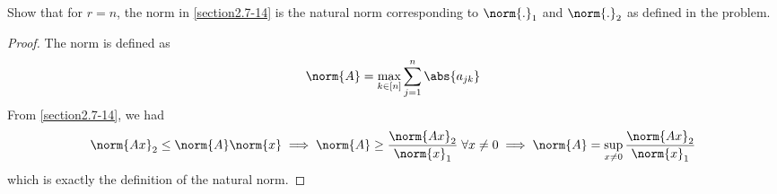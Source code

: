\begin{question}
    Show that for $r = n$, the norm in \ref{section2.7-14} is the natural norm corresponding to $\norm{.}_1$ and $\norm{.}_2$ as defined in the problem.
    \label{section2.7-15}
\end{question}
\begin{proof}
    The norm is defined as 
    \[\norm{A} = \max_{k \in [n]} \sum_{j=1}^n \abs{a_{jk}}\]
    From \ref{section2.7-14}, we had
    \[\norm{Ax}_2 \leq \norm{A} \norm{x} \implies \norm{A} \geq \frac{\norm{Ax}_2}{\norm{x}_1} \;\forall x \neq 0 \implies \norm{A} = \sup_{x \neq 0} \frac{\norm{Ax}_2}{\norm{x}_1}\]
    which is exactly the definition of the natural norm.
\end{proof}